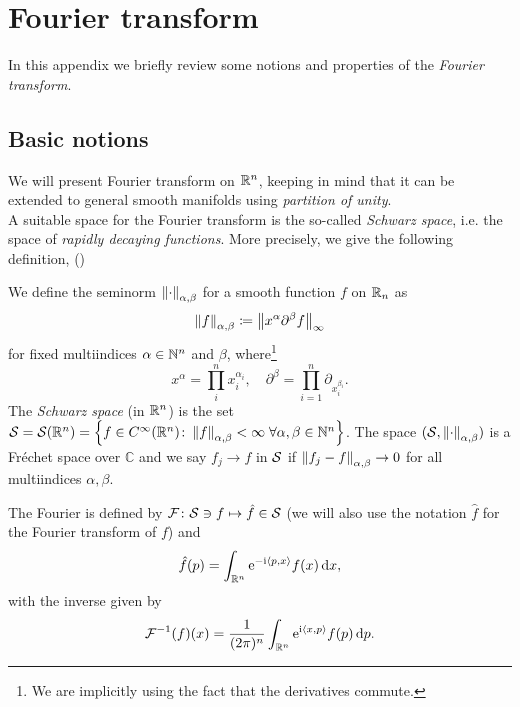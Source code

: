 
\chapter{Fourier transform} %

\label{Appendix_Fourier} %
\thispagestyle{empty}

In this appendix we briefly review some notions and properties of the \emph{Fourier transform}.

\section{Basic notions}

We will present Fourier transform on $\mathbb{R}^{n}$, keeping in mind that it can be extended to general smooth manifolds using \emph{partition of unity}.\\

A suitable space for the Fourier transform is the so-called \emph{Schwarz space}, i.e. the space of \emph{rapidly decaying functions}. More precisely, we give the following definition, (\cite{Horm:book1})

\begin{defin}
\label{def:scwharz_space}
We define the seminorm $\left\lVert \cdot\right\rVert_{\alpha,\beta}$ for a smooth function $f$ on $\mathbb{R}_{n}$ as 
\[
\left\lVert f\right\rVert_{\alpha,\beta}\coloneqq\left\lVert x^{\alpha}\partial^{\beta}f\right\rVert_{\infty}
\]
for fixed multiindices $\alpha\in\mathbb{N}^{n}$ and $\beta$, where\footnote{We are implicitly using the fact that the derivatives commute.}
\[
x^{\alpha}=\prod_{i}^{n}x_{i}^{\alpha_{i}},\quad\partial^{\beta}=\prod_{i=1}^{n}\partial_{x_{i}^{\beta_{i}}}.
\]
The \emph{Schwarz space} (in $\mathbb{R}^{n}$) is the set $\mathcal{S}=\mathcal{S}(\mathbb{R}^{n})=\left\{f\in C^{\infty}(\mathbb{R}^{n})\colon\left\lVert f\right\rVert_{\alpha,\beta}<\infty\;\forall\alpha,\beta\in\mathbb{N}^{n}\right\}$. The space $(\mathcal{S},\left\lVert \cdot\right\rVert_{\alpha,\beta})$ is a Fréchet space over $\mathbb{C}$ and we say $f_{j}\to f$ in $\mathcal{S}$ if $\left\lVert f_{j}-f\right\rVert_{\alpha,\beta}\to 0$ for all multiindices $\alpha,\beta$. 
\end{defin}


\begin{defin}
\label{def:Four_transform}
The Fourier is defined by $\operatorname{\mathcal{F}}\colon\mathcal{S}\ni f\mapsto\hat{f}\in\mathcal{S}$ (we will also use the notation $\hat{f}$ for the Fourier transform of $f$) and 
\[
\hat{f}(p)=\int_{\mathbb{R}^{n}}\mathrm{e}^{-\mathrm{i}\left< p,x\right>}f(x)\mathop{}\!\mathrm{d} x,
\]
with the inverse given by
\[
\operatorname{\mathcal{F}}^{-1}(f)(x)=\frac{1}{(2\pi)^{n}}\int_{\mathbb{R}^{n}}\mathrm{e}^{\mathrm{i}\left< x,p\right>}f(p)\mathop{}\!\mathrm{d} p.
\]
\end{defin}

